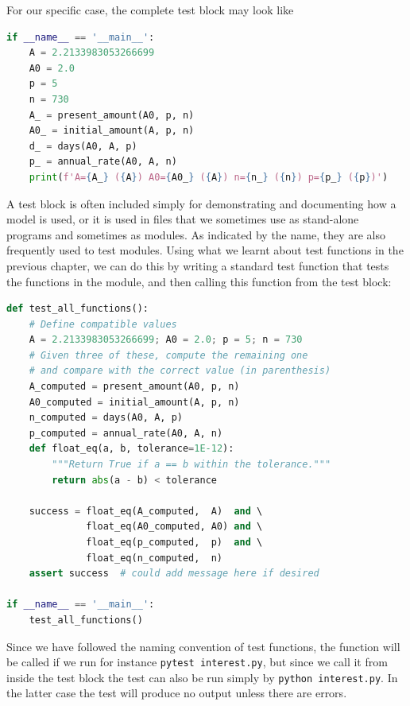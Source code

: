 \documentclass[graybox,envcountchap,sectrefs,final]{svmonodo}
\begin{document}
For our specific case, the complete test block may look like
\begin{lstlisting}[language=Python,style=blue1]
if __name__ == '__main__':
    A = 2.2133983053266699
    A0 = 2.0
    p = 5
    n = 730
    A_ = present_amount(A0, p, n)
    A0_ = initial_amount(A, p, n)
    d_ = days(A0, A, p)
    p_ = annual_rate(A0, A, n)
    print(f'A={A_} ({A}) A0={A0_} ({A}) n={n_} ({n}) p={p_} ({p})')
\end{lstlisting}
A test block is often included simply for demonstrating and documenting how a model is used, or it is used
in files that we sometimes use as stand-alone programs and sometimes as modules. As indicated by the name, they are also
frequently used to test modules. Using what we learnt about test functions in the previous chapter, we can do this
by writing a standard test function that tests the functions in the module, and then calling this function from
the test block:
\begin{lstlisting}[language=Python,style=blue1]
def test_all_functions():
    # Define compatible values
    A = 2.2133983053266699; A0 = 2.0; p = 5; n = 730
    # Given three of these, compute the remaining one
    # and compare with the correct value (in parenthesis)
    A_computed = present_amount(A0, p, n)
    A0_computed = initial_amount(A, p, n)
    n_computed = days(A0, A, p)
    p_computed = annual_rate(A0, A, n)
    def float_eq(a, b, tolerance=1E-12):
        """Return True if a == b within the tolerance."""
        return abs(a - b) < tolerance

    success = float_eq(A_computed,  A)  and \ 
              float_eq(A0_computed, A0) and \ 
              float_eq(p_computed,  p)  and \ 
              float_eq(n_computed,  n)
    assert success  # could add message here if desired

if __name__ == '__main__':
    test_all_functions()
\end{lstlisting}
Since we have followed the naming convention of test functions, the function will be called if we run for instance
\texttt{pytest interest.py}, but since we call it from inside the test block the test can also be run simply
by \texttt{python interest.py}. In the latter case the test will produce no output unless there are errors.
\end{document}
